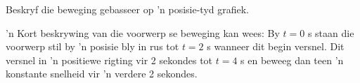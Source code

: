 \begin{wex}{Beskryf die beweging gebasseer op 'n posisie-tyd grafiek.}
{\begin{center}
\end{center}

'n Kort beskrywing van die voorwerp se beweging kan wees: By $t=0$ s staan die voorwerp stil by 'n posisie bly in rus tot $t=2$ s wanneer dit begin versnel. Dit versnel in 'n positiewe rigting vir 2 sekondes tot $t=4$ s en beweeg dan teen 'n konstante snelheid vir 'n verdere 2 sekondes.
}
\end{wex}


